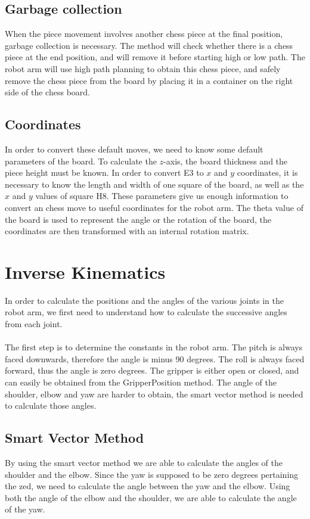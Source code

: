 \documentclass[11pt,a4paper]{article}
\begin{document}
\subsection{Garbage collection}
When the piece movement involves another chess piece at the final position, garbage collection is necessary. The method will check whether there is a chess piece at the end position, and will remove it before starting high or low path. The robot arm will use high path planning to obtain this chess piece, and safely remove the chess piece from the board by placing it in a container on the right side of the chess board.

\subsection{Coordinates}
In order to convert these default moves, we need to know some default parameters of the board. To calculate the $z$-axis, the board thickness and the piece height must be known. In order to convert E3 to $x$ and $y$ coordinates, it is necessary to know the length and width of one square of the board, as well as the $x$ and $y$ values of square H8. These parameters give us enough information to convert an chess move to useful coordinates for the robot arm. The theta value of the board is used to represent the angle or the rotation of the board, the coordinates are then transformed with an internal rotation matrix.

\section{Inverse Kinematics}
In order to calculate the positions and the angles of the various joints in the robot arm, we first need to understand how to calculate the successive angles from each joint.
\\ 
\\
\noindent
The first step is to determine the constants in the robot arm. The pitch is always faced downwards, therefore the angle is minus 90 degrees. The roll is always faced forward, thus the angle is zero degrees. The gripper is either open or closed, and can easily be obtained from the GripperPosition method. The angle of the shoulder, elbow and yaw are harder to obtain, the smart vector method is needed to calculate those angles.\cite{lego2012}

\subsection{Smart Vector Method}
By using the smart vector method we are able to calculate the angles of the shoulder and the elbow. Since the yaw is supposed to be zero degrees pertaining the zed, we need to calculate the angle between the yaw and the elbow. Using both the angle of the elbow and the shoulder, we are able to calculate the angle of the yaw.
\end{document}
